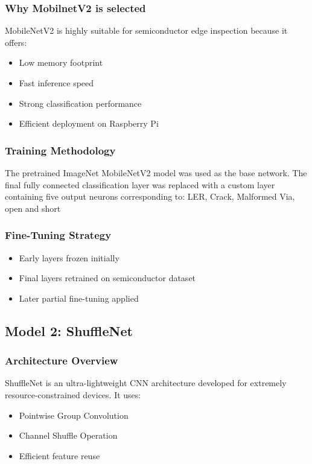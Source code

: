 \subsubsection{Why MobilnetV2 is selected}
MobileNetV2 is highly suitable for semiconductor edge inspection because it offers:
\begin{itemize}
\item Low memory footprint
\item Fast inference speed
\item Strong classification performance
\item Efficient deployment on Raspberry Pi
\end{itemize}

\subsubsection{ Training Methodology}

The pretrained ImageNet MobileNetV2 model was used as the base network. The final fully connected classification layer was replaced with a custom layer containing five output neurons corresponding to: LER, Crack, Malformed Via, open and short
\subsubsection{ Fine-Tuning Strategy}
\begin{itemize}

\item Early layers frozen initially
\item Final layers retrained on semiconductor dataset
\item Later partial fine-tuning applied
\end{itemize}

\subsection{Model 2: ShuffleNet }

\subsubsection{Architecture Overview}
ShuffleNet is an ultra-lightweight CNN architecture developed for extremely resource-constrained devices. It uses:
\begin{itemize}
\item Pointwise Group Convolution
\item Channel Shuffle Operation
\item Efficient feature reuse
\end{itemize}

